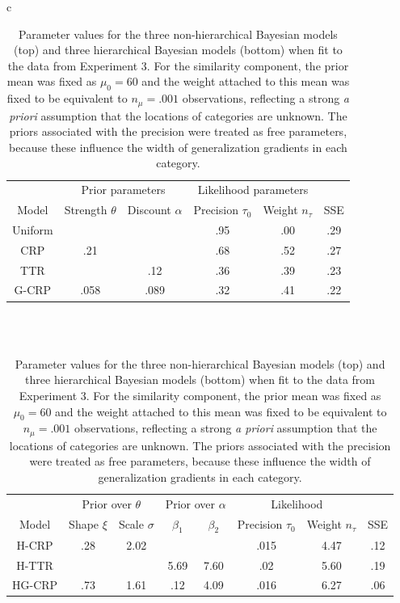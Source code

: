 \documentclass[doc]{apa6}
\begin{document}
\begin{table}[t]
\caption{Parameter values for the three non-hierarchical Bayesian models (top) and three hierarchical Bayesian models (bottom) when fit to the data from Experiment 3. For the similarity component, the prior mean was fixed as $\mu_0 = 60$ and the weight attached to this mean was fixed to be equivalent to $n_\mu =.001$ observations, reflecting a strong {\it a priori} assumption that the locations of categories are unknown. The priors associated with the precision were treated as free parameters, because these influence the width of generalization gradients in each category.}
\label{exp3fits}
\vspace*{6pt}
\footnotesize
\begin{tabular}{c}
\begin{tabular}{c|cc|cc|c}
& \multicolumn{2}{c|}{Prior parameters} &   \multicolumn{2}{c|}{Likelihood parameters} &\\
Model & Strength $\theta$ & Discount $\alpha$ & Precision $\tau_0$ & Weight $n_\tau$ & SSE \\ \hline
Uniform & & & .95 & .00 & .29 \\
CRP & .21 &  & .68 & .52 & .27 \\
TTR &  & .12 & .36 & .39 & .23 \\
G-CRP & .058 & .089 & .32 & .41 & .22
\end{tabular}
\\ \\
\begin{tabular}{c|cc|cc|cc|c}
& \multicolumn{2}{c|}{Prior over $\theta$} & \multicolumn{2}{c|}{Prior over $\alpha$}  &   \multicolumn{2}{c|}{Likelihood} &\\
Model & Shape $\xi$ & Scale $\sigma$ & $\beta_1$ & $\beta_2$ & Precision $\tau_0$  & Weight $n_\tau$  & SSE \\ \hline
H-CRP & .28 & 2.02 & & & .015 & 4.47 & .12 \\
H-TTR & & & 5.69 & 7.60 & .02 & 5.60 & .19 \\
HG-CRP & .73 & 1.61 & .12 & 4.09 & .016 & 6.27 & .06
\end{tabular}
\end{tabular}
\end{table}
\end{document}
